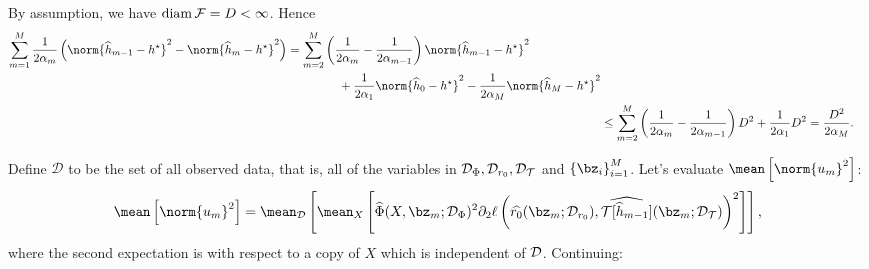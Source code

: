 \begin{description}[style=unboxed, leftmargin=0cm]
    \item[First term]
        By assumption, we have $ \operatorname{diam} \mathcal{F} = D < \infty $.
        Hence
        \begin{align*}
            \begin{split}
                \sum_{ m=1 }^{ M } \frac{ 1 }{ 2 \alpha_{ m } } \left(
                    \norm{ \hat{ h }_{ m-1 } - \hstar }^2
                    -
                    \norm{ \hat{ h }_{ m } - \hstar }^2
                \right)
                &= \sum_{ m=2 }^{ M } \left(
                    \frac{ 1 }{ 2 \alpha_{ m } } - \frac{ 1 }{ 2 \alpha_{ m-1 } } 
                \right) \norm{ \hat{ h }_{ m-1 } - \hstar }^2 \\
                &\hspace{1.5cm}+ \frac{ 1 }{ 2 \alpha_{ 1 } } \norm{ \hat{ h }_{ 0 } - \hstar }^2 - \frac{ 1 }{ 2 \alpha_{ M } } \norm{ \hat{ h }_{ M } - \hstar }^2
            \end{split} \\
            &\leq 
            \sum_{ m=2 }^{ M } \left(
                \frac{ 1 }{ 2 \alpha_{ m } } - \frac{ 1 }{ 2 \alpha_{ m-1 } } 
            \right) D^2 + \frac{ 1 }{ 2 \alpha_{ 1 } } D^2 = \frac{ D^2 }{ 2 \alpha_{ M } }
        .\end{align*}
    \item[Second term]
        Define $ \mathcal{D} $ to be the set of all observed data, that is, all of the variables in $ \mathcal{D}_{ \Phi }, \mathcal{D}_{ r_{ 0 } }, \mathcal{D}_{ \mathcal{T} } $ and $ \left\{ \bz_{ i } \right\}_{ i=1 }^{ M } $.
        Let's evaluate $ \mean \left[ \norm{ u_{ m } }^2 \right] $:
        \begin{equation*}
            \mean \left[
                \norm{ u_{ m } }^2
            \right]
            = \mean_{ \data } \left[
                \mean_{ X } \left[
                    \hat{ \Phi } ( X, \bz_{ m } ; \mathcal{D}_{ \Phi } )^2
                    \partial_{ 2 } \loss \left(
                        \hat{ r_{ 0 } } ( \bz_{ m } ; \mathcal{D}_{ r_{ 0 } } ),
                        \hat{ \mathcal{T} [ \hat{ h }_{ m-1 } ] } ( \bz_{ m } ; \mathcal{D}_{ \mathcal{T} } )
                    \right)^2
                \right]
            \right]
        ,\end{equation*}
        where the second expectation is with respect to a copy of $ X $ which is independent of $ \mathcal{D} $.
        Continuing:
        \begin{align*}

\end{align*}
\end{description}
